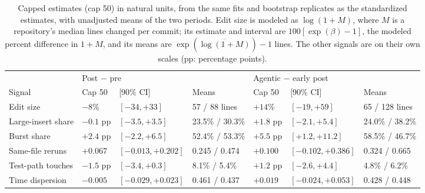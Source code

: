 \begin{table}[!htbp]
\caption{Capped estimates (cap 50) in natural units, from the same fits and bootstrap replicates as the standardized estimates, with unadjusted means of the two periods. Edit size is modeled as $\log(1+M)$, where $M$ is a repository's median lines changed per commit; its estimate and interval are $100[\exp(\beta)-1]$, the modeled percent difference in $1+M$, and its means are $\exp(\overline{\log(1+M)})-1$ lines. The other signals are on their own scales (pp: percentage points).}
\label{tab:natural}
\scriptsize
\setlength{\tabcolsep}{3pt}
\begin{tabular}{@{}l l l l l l l@{}}
\toprule
 & \multicolumn{3}{l}{Post $-$ pre} & \multicolumn{3}{l}{Agentic $-$ early post} \\
Signal & Cap 50 & [90\% CI] & Means & Cap 50 & [90\% CI] & Means \\
\midrule
Edit size & $-8$\% & $[-34, +33]$ & 57 / 88 lines & $+14$\% & $[-19, +59]$ & 65 / 128 lines \\
Large-insert share & $-0.1$ pp & $[-3.5, +3.5]$ & 23.5\% / 30.3\% & $+1.8$ pp & $[-2.1, +5.4]$ & 24.0\% / 38.2\% \\
Burst share & $+2.4$ pp & $[-2.2, +6.5]$ & 52.4\% / 53.3\% & $+5.5$ pp & $[+1.2, +11.2]$ & 58.5\% / 46.7\% \\
Same-file reruns & $+0.067$ & $[-0.013, +0.202]$ & 0.245 / 0.474 & $+0.100$ & $[-0.102, +0.386]$ & 0.324 / 0.665 \\
Test-path touches & $-1.5$ pp & $[-3.4, +0.3]$ & 8.1\% / 5.4\% & $+1.2$ pp & $[-2.6, +4.4]$ & 4.8\% / 6.2\% \\
Time dispersion & $-0.005$ & $[-0.029, +0.023]$ & 0.461 / 0.437 & $+0.019$ & $[-0.024, +0.053]$ & 0.428 / 0.448 \\
\bottomrule
\end{tabular}
\end{table}
